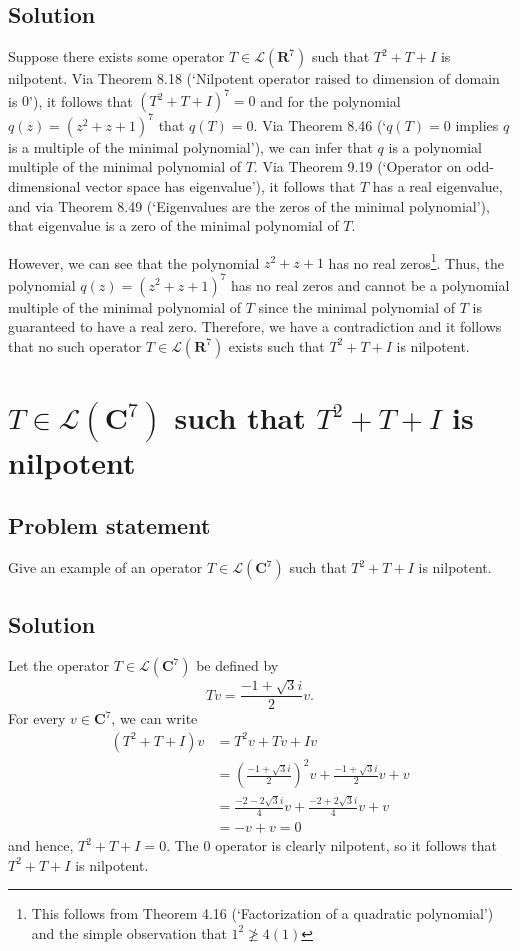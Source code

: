 \documentclass{article}
\begin{document}
\subsection*{Solution}
Suppose there exists some operator $T\in\mathcal{L}(\mathbf{R}^7)$ such that $T^2+T+I$ is nilpotent. Via Theorem 8.18 (`Nilpotent operator raised to dimension of domain is $0$'), it follows that $(T^2+T+I)^7=0$ and for the polynomial $q(z)=(z^2+z+1)^7$ that $q(T)=0$. Via Theorem 8.46 (`$q(T)=0$ implies $q$ is a multiple of the minimal polynomial'), we can infer that $q$ is a polynomial multiple of the minimal polynomial of $T$. Via Theorem 9.19 (`Operator on odd-dimensional vector space has eigenvalue'), it follows that $T$ has a real eigenvalue, and via Theorem 8.49 (`Eigenvalues are the zeros of the minimal polynomial'), that eigenvalue is a zero of the minimal polynomial of $T$.

However, we can see that the polynomial $z^2+z+1$ has no real zeros\footnote{This follows from Theorem 4.16 (`Factorization of a quadratic polynomial') and the simple observation that $1^2\ngeq 4(1)$}. Thus, the polynomial $q(z)=(z^2+z+1)^7$ has no real zeros and cannot be a polynomial multiple of the minimal polynomial of $T$ since the minimal polynomial of $T$ is guaranteed to have a real zero. Therefore, we have a contradiction and it follows that no such operator $T\in\mathcal{L}(\mathbf{R}^7)$ exists such that $T^2+T+I$ is nilpotent.

\clearpage

\section{$T\in\mathcal{L}(\mathbf{C}^7)$ such that $T^2+T+I$ is nilpotent}
\subsection*{Problem statement}
Give an example of an operator $T\in\mathcal{L}(\mathbf{C}^7)$ such that $T^2+T+I$ is nilpotent.

\subsection*{Solution}
Let the operator $T\in\mathcal{L}(\mathbf{C}^7)$ be defined by
\[Tv=\frac{-1+\sqrt{3}i}{2}v.\]
For every $v\in\mathbf{C}^7$, we can write
\begin{align*}
    (T^2+T+I)v&=T^2v+Tv+Iv\\
    &=(\frac{-1+\sqrt{3}i}{2})^2v+\frac{-1+\sqrt{3}i}{2}v+v\\
    &=\frac{-2-2\sqrt{3}i}{4}v+\frac{-2+2\sqrt{3}i}{4}v+v\\
    &=-v+v=0
\end{align*}
and hence, $T^2+T+I=0$. The $0$ operator is clearly nilpotent, so it follows that $T^2+T+I$ is nilpotent.
\end{document}
